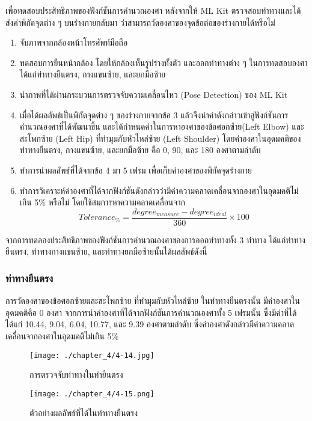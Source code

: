 เพื่อทดสอบประสิทธิภาพของฟังก์ชันการคำนวณองศา หลังจากให้ ML Kit ตรวจสอบท่าทางและได้ส่งค่าพิกัดจุดต่าง ๆ บนร่างกายกลับมา ว่าสามารถวัดองศาของจุดข้อต่อของร่างกายได้หรือไม่
\begin{enumerate}
	\item จับภาพจากกล้องหน้าโทรศัพท์มือถือ
	\item ทดสอบการยืนหน้ากล้อง โดยให้กล้องเห็นรูปร่างทั้งตัว และออกท่าทางต่าง ๆ ในการทดสอบองศา ได้แก่ท่าทางยืนตรง, กางแขนซ้าย, และยกมือซ้าย
	\item นำภาพที่ได้ผ่านกระบวนการตรวจจับความเคลื่อนไหว (Pose Detection) ของ ML Kit
	\item เมื่อได้ผลลัพธ์เป็นพิกัดจุดต่าง ๆ ของร่างกายจากข้อ 3 แล้วจึงนำค่าดังกล่าวเข้าสู่ฟังก์ชันการคำนวณองศาที่ได้พัฒนาขึ้น และได้กำหนดค่าในการหาองศาของข้อศอกซ้าย(Left Elbow) และสะโพกซ้าย (Left Hip) ที่ทำมุมกับหัวไหล่ซ้าย (Left Shoulder) โดยค่าองศาในอุดมคติของท่าทางยืนตรง, กางแขนซ้าย, และยกมือซ้าย คือ 0, 90, และ 180 องศาตามลำดับ
	\item ทำการนำผลลัพธ์ที่ได้จากข้อ 4 มา 5 เฟรม เพื่อเก็บค่าองศาของพิกัดจุดร่างกาย
	\item ทำการวิเคราะห์ค่าองศาที่ได้จากฟังก์ชันดังกล่าวว่ามีค่าความคลาดเคลื่อนจากองศาในอุดมคติไม่เกิน 5\% หรือไม่ โดยใช้สมการหาความคลาดเคลื่อนจาก
	      \begin{equation}
		      Tolerance_\%=\frac{degree_{measure} - degree_{ideal}}{360} \times 100
	      \end{equation}
\end{enumerate}
จากการทดลองประสิทธิภาพของฟังก์ชันการคำนวณองศาของการออกท่าทางทั้ง 3 ท่าทาง ได้แก่ท่าทางยืนตรง, ท่าทางกางแขนซ้าย, และท่าทางยกมือซ้ายนั้นได้ผลลัพธ์ดังนี้
\subsubsection{ท่าทางยืนตรง}
การวัดองศาของข้อศอกซ้ายและสะโพกซ้าย ที่ทำมุมกับหัวไหล่ซ้าย ในท่าทางยืนตรงนั้น มีค่าองศาในอุดมคติคือ 0 องศา จากการนำค่าองศาที่ได้จากฟังก์ชันการคำนวณองศาทั้ง 5 เฟรมนั้น ซึ่งมีค่าที่ได้ ได้แก่ 10.44, 9.04, 6.04, 10.77, และ 9.39 องศาตามลำดับ ซึ่งค่าองศาดังกล่าวมีค่าความคลาดเคลื่อนจากองศาในอุดมคติไม่เกิน 5\%
\begin{figure}
	\texttt{[image: ./chapter\_4/4-14.jpg]}
	\caption{การตรวจจับท่าทางในท่ายืนตรง}
\end{figure}
\begin{figure}
	\texttt{[image: ./chapter\_4/4-15.png]}
	\caption{ตัวอย่างผลลัพธ์ที่ได้ในท่าทางยืนตรง}
\end{figure}
